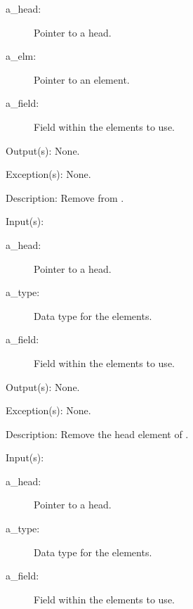 \begin{capi}
\begin{capilist}
		\begin{description}\item[]
		\item[a\_head: ]
			Pointer to a  head.
		\item[a\_elm: ]
			Pointer to an element.
		\item[a\_field: ]
			Field within the  elements to use.
		\end{description}
	\item[Output(s): ] None.
	\item[Exception(s): ] None.
	\item[Description: ]
		Remove  from .
	\end{capilist}
\label{ql_head_remove}
	\begin{capilist}
	\item[Input(s): ]
		\begin{description}\item[]
		\item[a\_head: ]
			Pointer to a  head.
		\item[a\_type: ]
			Data type for the  elements.
		\item[a\_field: ]
			Field within the  elements to use.
		\end{description}
	\item[Output(s): ] None.
	\item[Exception(s): ] None.
	\item[Description: ]
		Remove the head element of .
	\end{capilist}
\label{ql_tail_remove}
	\begin{capilist}
	\item[Input(s): ]
		\begin{description}\item[]
		\item[a\_head: ]
			Pointer to a \classname{ql} head.
		\item[a\_type: ]
			Data type for the  elements.
		\item[a\_field: ]
			Field within the  elements to use.

\end{description}
\end{capilist}
\end{capi}
